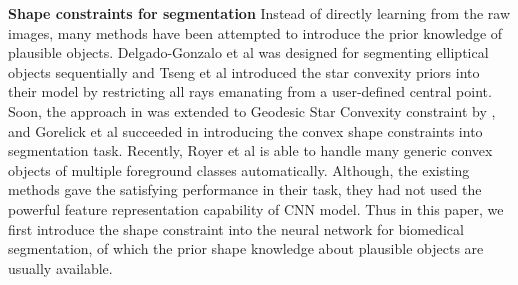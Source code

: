 \textbf{Shape constraints for segmentation} Instead of directly learning from the raw images, many methods have been attempted to introduce the prior knowledge of plausible objects.
Delgado-Gonzalo et al \cite{Delgado-Gonzalo2012} was designed for segmenting elliptical objects sequentially and Tseng et al \cite{Veksler2008a} introduced the star convexity priors into their model by restricting all rays emanating from a user-defined central point.
Soon, the approach in \cite{Veksler2008a} was extended to Geodesic Star Convexity constraint by \cite{Gulshan2010a}, and Gorelick et al \cite{Gorelick2014a} succeeded in introducing the convex shape constraints into segmentation task.
Recently, Royer et al \cite{Royer2016a} is able to handle many generic convex objects of multiple foreground classes automatically.
Although, the existing methods gave the satisfying performance in their task, they had not used the powerful feature representation capability of CNN model.
Thus in this paper, we first introduce the shape constraint into the neural network for biomedical segmentation, of which the prior shape knowledge about plausible objects are usually available.
